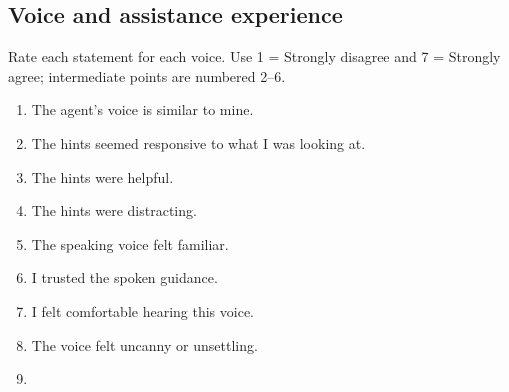 \subsection{Voice and assistance experience}
Rate each statement for each voice. Use 1 = Strongly disagree and 7 = Strongly agree; intermediate points are numbered 2--6.
\begin{enumerate}
\item \begin{minipage}[t]{\linewidth}
The agent's voice is similar to mine.
\end{minipage}
\item \begin{minipage}[t]{\linewidth}
The hints seemed responsive to what I was looking at.
\end{minipage}
\item \begin{minipage}[t]{\linewidth}
The hints were helpful.
\end{minipage}
\item \begin{minipage}[t]{\linewidth}
The hints were distracting.
\end{minipage}
\item \begin{minipage}[t]{\linewidth}
The speaking voice felt familiar.
\end{minipage}
\item \begin{minipage}[t]{\linewidth}
I trusted the spoken guidance.
\end{minipage}
\item \begin{minipage}[t]{\linewidth}
I felt comfortable hearing this voice.
\end{minipage}
\item \begin{minipage}[t]{\linewidth}
The voice felt uncanny or unsettling.
\end{minipage}
\item \begin{minipage}[t]{\linewidth}

\end{minipage}
\end{enumerate}
